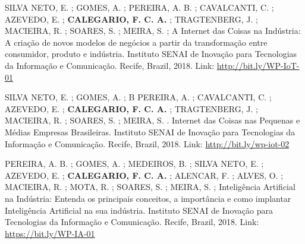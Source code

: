 \begin{cvparagraph} 
SILVA NETO, E. ; GOMES, A. ; PEREIRA, A. B. ; CAVALCANTI, C. ; AZEVEDO, E. ; \textbf{CALEGARIO, F. C. A.} ; TRAGTENBERG, J. ; MACIEIRA, R. ; SOARES, S. ; MEIRA, S. ; A Internet das Coisas na Indústria: A criação de novos modelos de negócios a partir da transformação entre consumidor, produto e indústria. Instituto SENAI de Inovação para Tecnologias da Informação e Comunicação. Recife, Brazil, 2018.
Link: \href{http://bit.ly/WP-IoT-01}{http://bit.ly/WP-IoT-01}
\end{cvparagraph}
\begin{cvparagraph} 
SILVA NETO, E. ; GOMES, A. ; B PEREIRA, A. ; CAVALCANTI, C. ; AZEVEDO, E. ; \textbf{CALEGARIO, F. C. A.} ; TRAGTENBERG, J. ; MACIEIRA, R. ; SOARES, S. ; MEIRA, S. . Internet das Coisas nas Pequenas e Médias Empresas Brasileiras. Instituto SENAI de Inovação para Tecnologias da Informação e Comunicação. Recife, Brazil, 2018.
Link: \href{http://bit.ly/wp-iot-02}{http://bit.ly/wp-iot-02}
\end{cvparagraph}
\begin{cvparagraph} 
PEREIRA, A. B. ; GOMES, A. ; MEDEIROS, B. ; SILVA NETO, E. ; AZEVEDO, E. ; \textbf{CALEGARIO, F. C. A.} ; ALENCAR, F. ; ALVES, O. ; MACIEIRA, R. ; MOTA, R. ; SOARES, S. ; MEIRA, S. ; Inteligência Artificial na Indústria: Entenda os principais conceitos, a importância e como implantar Inteligência Artificial na sua indústria. Instituto SENAI de Inovação para Tecnologias da Informação e Comunicação. Recife, Brazil, 2018.
Link: \href{https://bit.ly/WP-IA-01}{https://bit.ly/WP-IA-01}
\end{cvparagraph}
